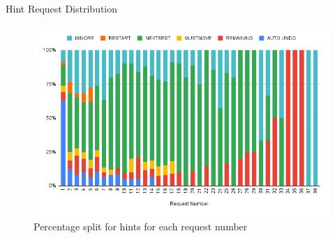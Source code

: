 \begin{frame}{Hint Request Distribution}

\begin{figure}[tpb]
  \centering
\includegraphics[width=0.9\columnwidth]{../img/reqdistribution.png}
  \caption{Percentage split for hints for each request number}
  \label{fig:reqdistribution}
\end{figure}

\end{frame}